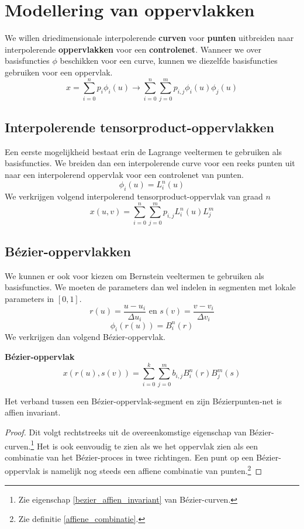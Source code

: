 \documentclass[computergesteund_ontwerp_van_curven_en_oppervlakken.tex]{subfiles}
\begin{document}
\chapter{Modellering van oppervlakken}
We willen driedimensionale interpolerende \textbf{curven} voor \textbf{punten} uitbreiden naar interpolerende \textbf{oppervlakken} voor een \textbf{controlenet}.
Wanneer we over basisfuncties $\phi$ beschikken voor een curve, kunnen we diezelfde basisfuncties gebruiken voor een oppervlak.
\[
x = \sum_{i=0}^{n}p_i\phi_{i}(u) \longrightarrow \sum_{i=0}^{n}\sum_{j=0}^{m}p_{i,j}\phi_{i}(u)\phi_{j}(u)
\]

\section{Interpolerende  tensorproduct-oppervlakken}
Een eerste mogelijkheid bestaat erin de Lagrange veeltermen te gebruiken als basisfuncties. We breiden dan een interpolerende curve voor een reeks punten uit naar een interpolerend oppervlak voor een controlenet van punten.
\[
\phi_{i}(u) = L_{i}^{n}(u)
\]
We verkrijgen volgend interpolerend tensorproduct-oppervlak van graad $n$
\[
x(u,v) = \sum_{i=0}^{n}\sum_{j=0}^{m}p_{i,j}L_{i}^{n}(u)L_{j}^{m}
\]

\section{B\'ezier-oppervlakken}
We kunnen er ook voor kiezen om Bernstein veeltermen te gebruiken als basisfuncties. 
We moeten de parameters dan wel indelen in segmenten met lokale parameters in $[0,1]$.
\[
r(u) = \frac{u-u_i}{\Delta u_i} \text{ en } s(v) = \frac{v-v_i}{\Delta v_i}
\]
\[
\phi_{i}(r(u)) = B_{i}^{n}(r)
\]
We verkrijgen dan volgend B\'ezier-oppervlak.
\begin{de}
\textbf{B\'ezier-oppervlak}
\[
x(r(u),s(v)) = \sum_{i=0}^{k}\sum_{j=0}^{m}b_{i,j}B_{i}^{n}(r)B_{j}^{m}(s)
\]
\end{de}

\begin{ei}
Het verband tussen een B\'ezier-oppervlak-segment en zijn B\'ezierpunten-net is affien invariant.
\begin{proof}
Dit volgt rechtstreeks uit de overeenkomstige eigenschap van B\'ezier-curven.\footnote{Zie eigenschap \ref{bezier_affien_invariant} van B\'ezier-curven.} Het is ook eenvoudig te zien als we het oppervlak zien als een combinatie van het B\'ezier-proces in twee richtingen. Een punt op een B\'ezier-oppervlak is namelijk nog steeds een affiene combinatie van punten.\footnote{Zie definitie \ref{affiene_combinatie}.}
\end{proof}
\end{ei}
\end{document}
